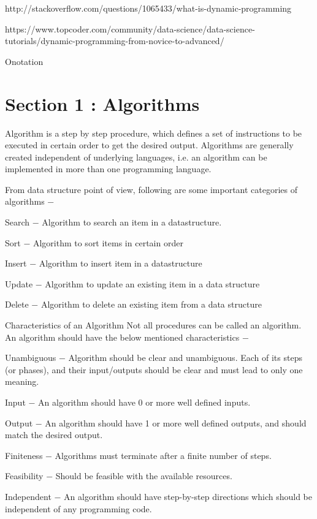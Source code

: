 http://stackoverflow.com/questions/1065433/what-is-dynamic-programming

https://www.topcoder.com/community/data-science/data-science-tutorials/dynamic-programming-from-novice-to-advanced/



Onotation

\section{Section 1 : Algorithms}
\begin{frame}
Algorithm is a step by step procedure, which defines a set of instructions to be executed in certain order to get the desired output. Algorithms are generally created independent of underlying languages, i.e. an algorithm can be implemented in more than one programming language.

\end{frame}
\begin{frame}
From data structure point of view, following are some important categories of algorithms −

Search − Algorithm to search an item in a datastructure.

Sort − Algorithm to sort items in certain order

Insert − Algorithm to insert item in a datastructure

Update − Algorithm to update an existing item in a data structure

Delete − Algorithm to delete an existing item from a data structure
\end{frame}
\begin{frame}
Characteristics of an Algorithm
Not all procedures can be called an algorithm. An algorithm should have the below mentioned characteristics −

Unambiguous − Algorithm should be clear and unambiguous. Each of its steps (or phases), and their input/outputs should be clear and must lead to only one meaning.

Input − An algorithm should have 0 or more well defined inputs.

Output − An algorithm should have 1 or more well defined outputs, and should match the desired output.

Finiteness − Algorithms must terminate after a finite number of steps.

Feasibility − Should be feasible with the available resources.

Independent − An algorithm should have step-by-step directions which should be independent of any programming code.
\end{frame}
